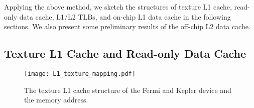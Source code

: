 \documentclass[10pt,journal,compsoc]{IEEEtran}
\theoremstyle{definition}
\begin{document}
Applying the above method, we sketch the structures of texture L1 cache, read-only data cache, L1/L2 TLBs, and on-chip L1 data cache in the following sections. We also present some preliminary results of the off-chip L2 data cache.





\subsection{Texture L1 Cache and Read-only Data Cache}

\begin{figure*}
\centering
  \texttt{[image: L1\_texture\_mapping.pdf]}
\caption{The texture L1 cache structure of the Fermi and Kepler device and the memory address.}
  \label{fig:textureL1cacheMapping}
\end{figure*}
\end{document}
